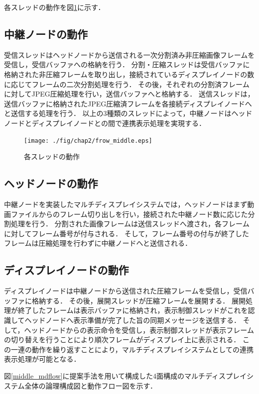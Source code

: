 各スレッドの動作を図\ref{middle_flow}に示す．

\subsection*{中継ノードの動作}
受信スレッドはヘッドノードから送信される一次分割済み非圧縮画像フレームを受信し，受信バッファへの格納を行う．
分割・圧縮スレッドは受信バッファに格納された非圧縮フレームを取り出し，接続されているディスプレイノードの数に応じてフレームの二次分割処理を行う．
その後，それぞれの分割済フレームに対してJPEG圧縮処理を行い，送信バッファへと格納する．
送信スレッドは，送信バッファに格納されたJPEG圧縮済フレームを各接続ディスプレイノードへと送信する処理を行う．
以上の3種類のスレッドによって，中継ノードはヘッドノードとディスプレイノードとの間で連携表示処理を実現する．

\begin{figure}[H]
  \hspace*{\fill}
  \texttt{[image: ./fig/chap2/frow\_middle.eps]}
  \hspace*{\fill}
  \caption{各スレッドの動作}
  \label{middle_flow}
\end{figure}

\subsection*{ヘッドノードの動作}
中継ノードを実装したマルチディスプレイシステムでは，ヘッドノードはまず動画ファイルからのフレーム切り出しを行い，接続された中継ノード数に応じた分割処理を行う．
分割された画像フレームは送信スレッドへ渡され，各フレームに対してフレーム番号が付与される．
そして，フレーム番号の付与が終了したフレームは圧縮処理を行わずに中継ノードへと送信される．

\subsection*{ディスプレイノードの動作}
ディスプレイノードは中継ノードから送信された圧縮フレームを受信し，受信バッファに格納する．
その後，展開スレッドが圧縮フレームを展開する．
展開処理が終了したフレームは表示バッファに格納され，表示制御スレッドがこれを認識してヘッドノードへ表示準備が完了した旨の同期メッセージを送信する．
そして，ヘッドノードからの表示命令を受信し，表示制御スレッドが表示フレームの切り替えを行うことにより順次フレームがディスプレイ上に表示される．
この一連の動作を繰り返すことにより，マルチディスプレイシステムとしての連携表示処理が可能となる．

図\ref{middle_mdflow}に提案手法を用いて構成した4面構成のマルチディスプレイシステム全体の論理構成図と動作フロー図を示す．


